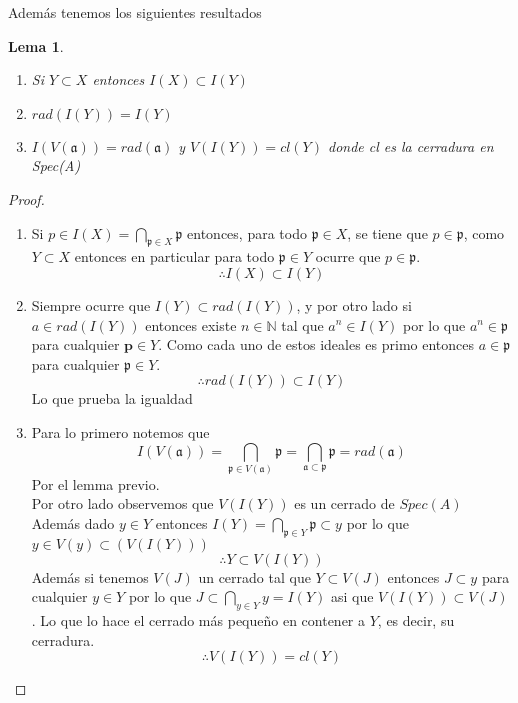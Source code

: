 \documentclass{article}
\newtheorem{lemma}{Lema}
\begin{document}
Además tenemos los siguientes resultados

\begin{lemma}
    \begin{enumerate}
    \item Si $Y \subset X$ entonces $I(X) \subset I(Y)$
    \item $rad(I(Y)) = I(Y)$
    \item $I(V(\mathfrak{a})) = rad(\mathfrak{a}) $
    y $V(I(Y)) = cl(Y)$ donde cl es la cerradura en Spec(A)
    \end{enumerate}
\end{lemma}
\begin{proof}
    \begin{enumerate}
        \item Si $p \in I(X) = \bigcap_{\mathfrak{p}\in X}\mathfrak{p}$
        entonces, para todo $\mathfrak{p}\in X$, se tiene que $p\in \mathfrak{p}$,
        como $Y \subset X$ entonces en particular para todo $\mathfrak{p}\in Y$
        ocurre que $p \in \mathfrak{p}$.
        $$\therefore I(X) \subset I(Y)$$
        \item Siempre ocurre que $I(Y)\subset rad(I(Y))$, y por otro lado
        si $a \in rad(I(Y))$ entonces existe $n\in \mathbb{N}$ tal que $a^n \in I(Y)$
        por lo que $a^n \in \mathfrak{p}$ para cualquier $\mathbf{p}\in Y$. 
        Como cada uno de estos ideales es primo entonces $a \in \mathfrak{p}$ para cualquier 
        $\mathfrak{p}\in Y$.
        $$\therefore rad(I(Y)) \subset I(Y)$$
        Lo que prueba la igualdad
        \item Para lo primero notemos que
        $$I(V(\mathfrak{a}))=\bigcap_{\mathfrak{p}\in V(\mathfrak{a})} \mathfrak{p}
        = \bigcap_{\mathfrak{a}\subset \mathfrak{p}} \mathfrak{p}
        = rad(\mathfrak{a})$$
        Por el lemma previo.
        \\
        Por otro lado observemos que $V(I(Y))$ es un cerrado de $Spec(A)$
        Además dado $y\in Y$ entonces $I(Y) = \bigcap_{\mathfrak{p}\in Y} \mathfrak{p}
        \subset y $ por lo que $y \in V(y) \subset (V(I(Y)))$
        $$\therefore Y\subset V(I(Y))$$
        Además si tenemos $V(J)$ un cerrado tal que $Y \subset V(J)$ entonces
        $J \subset y$ para cualquier $y \in Y$ por lo que $J \subset \bigcap_{y \in Y} y = I(Y)$
        asi que $V(I(Y)) \subset V(J)$.
        Lo que lo hace el cerrado más pequeño en contener a $Y$, es decir,
        su cerradura.
        $$\therefore V(I(Y)) = cl(Y)$$
    \end{enumerate}
\end{proof}
\end{document}
